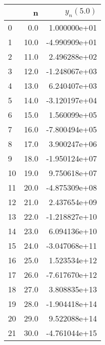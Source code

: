 \begin{tabular}{lrr}
\toprule
{} &     n &    $y_n(5.0)$ \\
\midrule
0  &   0.0 &  1.000000e+01 \\
1  &  10.0 & -4.990909e+01 \\
2  &  11.0 &  2.496288e+02 \\
3  &  12.0 & -1.248067e+03 \\
4  &  13.0 &  6.240407e+03 \\
5  &  14.0 & -3.120197e+04 \\
6  &  15.0 &  1.560099e+05 \\
7  &  16.0 & -7.800494e+05 \\
8  &  17.0 &  3.900247e+06 \\
9  &  18.0 & -1.950124e+07 \\
10 &  19.0 &  9.750618e+07 \\
11 &  20.0 & -4.875309e+08 \\
12 &  21.0 &  2.437654e+09 \\
13 &  22.0 & -1.218827e+10 \\
14 &  23.0 &  6.094136e+10 \\
15 &  24.0 & -3.047068e+11 \\
16 &  25.0 &  1.523534e+12 \\
17 &  26.0 & -7.617670e+12 \\
18 &  27.0 &  3.808835e+13 \\
19 &  28.0 & -1.904418e+14 \\
20 &  29.0 &  9.522088e+14 \\
21 &  30.0 & -4.761044e+15 \\
\bottomrule
\end{tabular}
